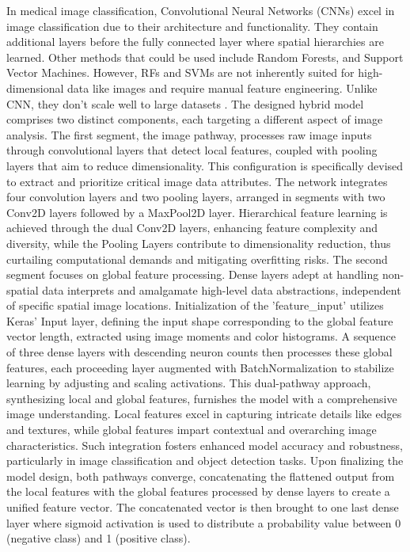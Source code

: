 \documentclass[10pt,twocolumn]{article}
\begin{document}
\begin{enumerate}
    In medical image classification, Convolutional Neural Networks (CNNs) excel in image classification due to their architecture and functionality. They contain additional layers before the fully connected layer where spatial hierarchies are learned. Other methods that could be used include Random Forests, and Support Vector Machines. However, RFs and SVMs are not inherently suited for high-dimensional data like images and require manual feature engineering. Unlike CNN, they don’t scale well to large datasets \cite{Khoong_2021}. The designed hybrid model comprises two distinct components, each targeting a different aspect of image analysis. \newline
    The first segment, the image pathway, processes raw image inputs through convolutional layers that detect local features, coupled with pooling layers that aim to reduce dimensionality. This configuration is specifically devised to extract and prioritize critical image data attributes. The network integrates four convolution layers and two pooling layers, arranged in segments with two Conv2D layers followed by a MaxPool2D layer. Hierarchical feature learning is achieved through the dual Conv2D layers, enhancing feature complexity and diversity, while the Pooling Layers contribute to dimensionality reduction, thus curtailing computational demands and mitigating overfitting risks. \newline
    The second segment focuses on global feature processing. Dense layers adept at handling non-spatial data interprets and amalgamate high-level data abstractions, independent of specific spatial image locations. Initialization of the 'feature\_input' utilizes Keras' Input layer, defining the input shape corresponding to the global feature vector length, extracted using image moments and color histograms. A sequence of three dense layers with descending neuron counts then processes these global features, each proceeding layer augmented with BatchNormalization to stabilize learning by adjusting and scaling activations.\newline
    This dual-pathway approach, synthesizing local and global features, furnishes the model with a comprehensive image understanding. Local features excel in capturing intricate details like edges and textures, while global features impart contextual and overarching image characteristics. Such integration fosters enhanced model accuracy and robustness, particularly in image classification and object detection tasks.\newline 
    Upon finalizing the model design, both pathways converge, concatenating the flattened output from the local features with the global features processed by dense layers to create a unified feature vector. The concatenated vector is then brought to one last dense layer where sigmoid activation is used to distribute a probability value between 0 (negative class) and 1 (positive class).

\end{enumerate}
\end{document}
